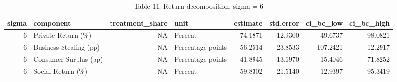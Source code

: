 \begin{table}

\caption{Table 11. Return decomposition, sigma = 6}
\centering
\begin{tabular}[t]{rlrlrrrr}
\toprule
sigma & component & treatment\_share & unit & estimate & std.error & ci\_bc\_low & ci\_bc\_high\\
\midrule
6 & Private Return (\%) & NA & Percent & 74.1871 & 12.9300 & 49.6737 & 98.0821\\
6 & Business Stealing (pp) & NA & Percentage points & -56.2514 & 23.8533 & -107.2421 & -12.2917\\
6 & Consumer Surplus (pp) & NA & Percentage points & 41.8945 & 13.6970 & 15.4046 & 71.8252\\
6 & Social Return (\%) & NA & Percent & 59.8302 & 21.5140 & 12.9397 & 95.3419\\
\bottomrule
\end{tabular}
\end{table}

